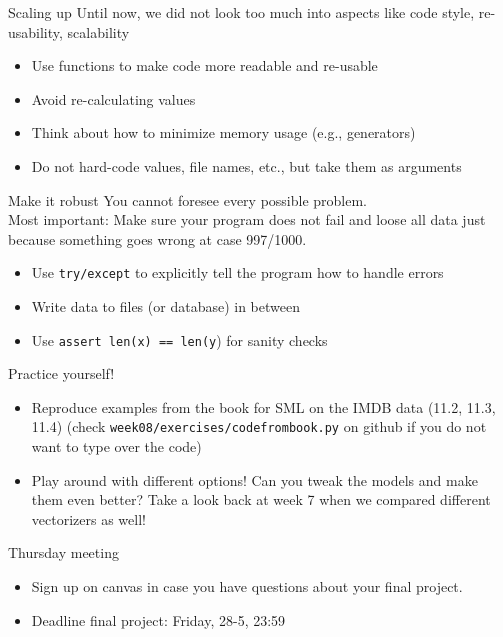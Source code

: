 \documentclass[handout]{beamer}
\begin{document}
\begin{frame}{Scaling up}
Until now, we did not look too much into aspects like code style, re-usability, scalability
\begin{itemize}
\item Use functions to make code more readable and re-usable
\item Avoid re-calculating values
\item Think about how to minimize memory usage (e.g., generators)
\item Do not hard-code values, file names, etc., but take them as arguments
\end{itemize}	
\end{frame}




\begin{frame}{Make it robust}
You cannot foresee every possible problem.\\
Most important: Make sure your program does not fail and loose all data just because something goes wrong at case 997/1000.
\begin{itemize}
\item Use \texttt{try/except} to explicitly tell the program how to handle errors
\item Write data to files (or database) in between
\item Use \texttt{assert len(x) == len(y}) for sanity checks
\end{itemize}	
\end{frame}



\begin{frame}{Practice yourself!}
\begin{itemize}
	\item Reproduce examples from the book for SML on the IMDB data (11.2, 11.3, 11.4) (check \texttt{week08/exercises/codefrombook.py} on github if you do not want to type over the code)
	\item Play around with different options! Can you tweak the models and make them even better? Take a look back at week 7 when we compared different vectorizers as well!
\end{itemize}
\end{frame}


\begin{frame}{Thursday meeting}
\begin{itemize}
	\item Sign up on canvas in case you have questions about your final project. 
	\item Deadline final project: Friday, 28-5, 23:59
\end{itemize}
\end{frame}

\begin{frame}
	\printbibliography
\end{frame}
\end{document}
